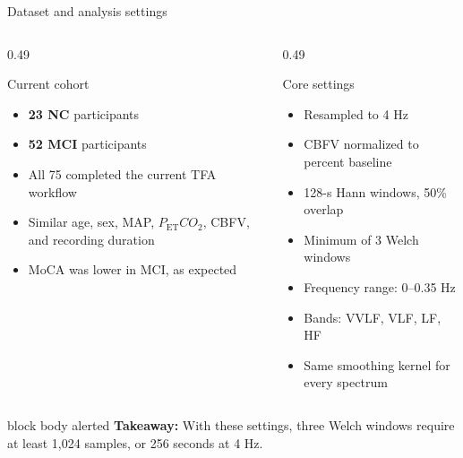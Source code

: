 \documentclass[aspectratio=169,11pt]{beamer}
\newcommand{\PETCOtwo}{P_{\mathrm{ET}}CO_2}
\newcommand{\takeaway}[1]{%
    \begin{beamercolorbox}[rounded=true,sep=0.12cm,wd=\linewidth]{block body alerted}
        \centering\textbf{Takeaway:} #1
    \end{beamercolorbox}}
\begin{document}
\begin{frame}{Dataset and analysis settings}
    \begin{columns}[T,onlytextwidth]
        \begin{column}{0.49\textwidth}
            \begin{block}{Current cohort}
                \begin{itemize}
                    \item \textcolor{ProjectBlue}{\textbf{23 NC}} participants
                    \item \textcolor{ProjectOrange}{\textbf{52 MCI}} participants
                    \item All 75 completed the current TFA workflow
                    \item Similar age, sex, MAP, $\PETCOtwo$, CBFV, and
                    recording duration
                    \item MoCA was lower in MCI, as expected
                \end{itemize}
            \end{block}
        \end{column}

        \begin{column}{0.49\textwidth}
            \begin{alertblock}{Core settings}
                \begin{itemize}
                    \item Resampled to 4 Hz
                    \item CBFV normalized to percent baseline
                    \item 128-s Hann windows, 50\% overlap
                    \item Minimum of 3 Welch windows
                    \item Frequency range: 0--0.35 Hz
                    \item Bands: VVLF, VLF, LF, HF
                    \item Same smoothing kernel for every spectrum
                \end{itemize}
            \end{alertblock}
        \end{column}
    \end{columns}

    \takeaway{With these settings, three Welch windows require at least
    1,024 samples, or 256 seconds at 4 Hz.}
\end{frame}
\end{document}
